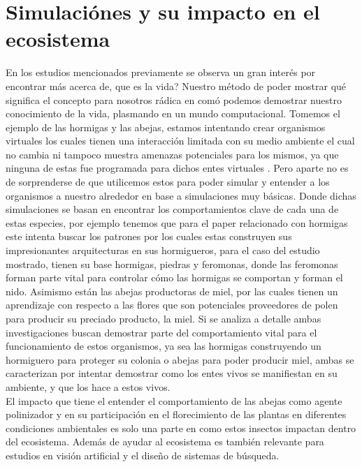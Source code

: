 \documentclass[conference]{IEEEtran}
\begin{document}
\section{Simulaci\'ones y su impacto en el ecosistema}


En los estudios mencionados previamente se observa un gran inter\'es por encontrar m\'as acerca de, que es la vida? Nuestro m\'etodo de poder mostrar qu\'e significa el concepto para nosotros r\'adica en com\'o podemos demostrar nuestro conocimiento de la vida, plasmando en un mundo computacional. 
Tomemos el ejemplo de las hormigas y las abejas, estamos intentando crear organismos virtuales los cuales tienen una interacci\'on limitada con su medio ambiente el cual no cambia ni tampoco muestra amenazas potenciales para los mismos, ya que ninguna de estas fue programada para dichos entes virtuales \cite{LP01} . Pero aparte no es de sorprenderse de que utilicemos estos para poder simular y entender a los organismos a nuestro alrededor en base a simulaciones muy b\'asicas. Donde dichas simulaciones se basan en encontrar los comportamientos clave de cada una de estas especies, por ejemplo tenemos que para el paper relacionado con hormigas este intenta buscar los patrones por los cuales estas construyen sus impresionantes arquitecturas en sus hormigueros, para el caso del estudio mostrado, tienen su base hormigas, piedras y feromonas, donde las feromonas forman parte vital para controlar c\'omo las hormigas se comportan y forman el nido. 
Asimismo est\'an las abejas productoras de miel, por las cuales tienen un aprendizaje con respecto a las flores que son potenciales proveedores de polen para producir su preciado producto, la miel. 
Si se analiza a detalle ambas investigaciones buscan demostrar parte del comportamiento vital para el funcionamiento de estos organismos, ya sea las hormigas construyendo un hormiguero para proteger su colonia o abejas para poder producir miel, ambas se caracterizan por intentar demostrar como los entes vivos se manifiestan en su ambiente, y que los hace a estos vivos. \cite{ZOE01} \\


El impacto que tiene el entender el comportamiento de las abejas como agente polinizador y en su participaci\'on en el florecimiento de las plantas en diferentes condiciones ambientales es solo una parte en como estos insectos impactan dentro del ecosistema. Adem\'as de ayudar al ecosistema es tambi\'en relevante para estudios en visi\'on artificial y el dise\~no de sistemas de b\'usqueda. \cite{ZOE01}
\end{document}
